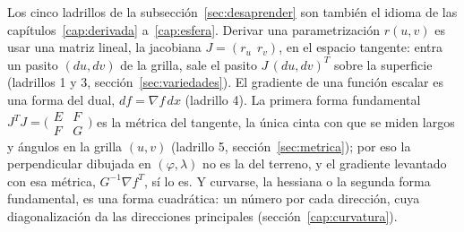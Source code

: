 \begin{resultado}
Los cinco ladrillos de la subsección~\ref{sec:desaprender} son también el idioma de las
capítulos~\ref{cap:derivada} a~\ref{cap:esfera}. Derivar una parametrización \(r(u,v)\) es usar una matriz lineal, la
jacobiana \(J=(r_u\ \ r_v)\), en el espacio tangente: entra un pasito \((du,dv)\) de la
grilla, sale el pasito \(J\,(du,dv)^T\) sobre la superficie (ladrillos 1 y 3,
sección~\ref{sec:variedades}). El gradiente de una función escalar es una forma del dual,
\(df=\nabla f\,dx\) (ladrillo 4). La primera forma fundamental \(J^TJ=
\bigl(\begin{smallmatrix}E&F\\ F&G\end{smallmatrix}\bigr)\) es la métrica del tangente,
la única cinta con que se miden largos y ángulos en la grilla \((u,v)\) (ladrillo 5,
sección~\ref{sec:metrica}); por eso la perpendicular dibujada en \((\varphi,\lambda)\) no
es la del terreno, y el gradiente levantado con esa métrica, \(G^{-1}\nabla f^{T}\), sí lo
es. Y curvarse, la hessiana o la segunda forma fundamental, es una forma cuadrática: un
número por cada dirección, cuya diagonalización da las direcciones principales
(sección~\ref{cap:curvatura}).
\end{resultado}
